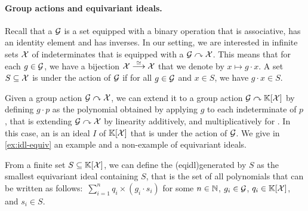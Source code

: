 \paragraph{Group actions and equivariant ideals.} Recall that a 
$\mathcal{G}$ is a set equipped with a binary operation that is associative, has an
identity element and has inverses. In our setting, we are interested in
infinite sets $\mathcal{X}$ of indeterminates that is equipped with a  $\mathcal{G} \curvearrowright \mathcal{X}$. This means that for each $g \in \mathcal{G}$,
we have a bijection $\mathcal{X} \stackrel{\simeq}{\longrightarrow} \mathcal{X}$ that we denote by $x \mapsto g \cdot x$. A
set $S \subseteq \mathcal{X}$ is  under the action of $\mathcal{G}$ if for
all $g \in \mathcal{G}$ and $x \in S$, we have $g \cdot x \in S$.

Given a group action $\mathcal{G} \curvearrowright \mathcal{X}$, we can extend it to a group
action $\mathcal{G} \curvearrowright \mathbb{K}[\mathcal{X}]$ by defining $g \cdot p$ as the
polynomial obtained by applying $g$ to each indeterminate of $p$, that is
extending $\mathcal{G} \curvearrowright \mathcal{X}$ by linearity additively, and
multiplicatively for . In this case, an 
is an ideal $I$ of $\mathbb{K}[\mathcal{X}]$ that is  under the action of
$\mathcal{G}$. We give in \cref{ex:idl-equiv} an example and a
non-example of equivariant ideals.

From a finite set $S \subseteq \mathbb{K}[\mathcal{X}]$, we can define the
 \kl(eqidl){generated by} $S$ as the smallest equivariant
ideal containing $S$, that is the set of all polynomials that can be written as
follows: $\,\sum_{i=1}^n q_i \times (g_i \cdot s_i)$ for some $n \in \mathbb{N}$, $g_i
\in \mathcal{G}$, $q_i \in \mathbb{K}[\mathcal{X}]$, and $s_i \in S$.


